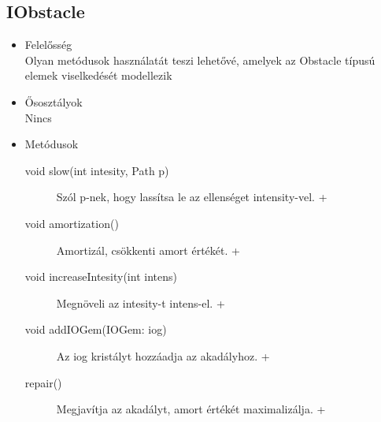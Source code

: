 \subsection{IObstacle}
\begin{itemize}
\item Felelősség\\
Olyan metódusok használatát teszi lehetővé, amelyek az Obstacle típusú elemek viselkedését modellezik
\item Ősosztályok\\
Nincs

\item Metódusok\\
	\begin{description}
		\item[void slow(int intesity, Path p)] Szól p-nek, hogy lassítsa le az ellenséget intensity-vel. +
\item[void amortization()] Amortizál, csökkenti amort értékét. +
\item[void increaseIntesity(int intens)] Megnöveli az intesity-t intens-el. +
\item[void addIOGem(IOGem: iog)] Az iog kristályt hozzáadja az akadályhoz. +
\item[repair()] Megjavítja az akadályt, amort értékét maximalizálja. +


		
		
	\end{description}
\end{itemize}
